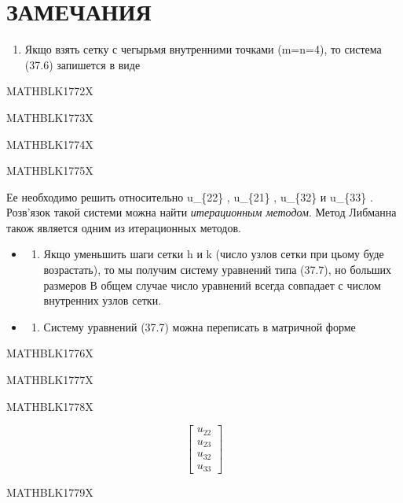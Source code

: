 \documentclass[
  ukrainian,
]{article}
\providecommand{\tightlist}{%
  \setlength{\itemsep}{0pt}\setlength{\parskip}{0pt}}
\begin{document}
\section{ЗАМЕЧАНИЯ}\label{ux437ux430ux43cux435ux447ux430ux43dux438ux44f-12}

\begin{enumerate}
\def\labelenumi{\arabic{enumi}.}
\tightlist
\item
  Якщо взять сетку с чегырьмя внутренними точками (m=n=4), то система
  (37.6) запишется в виде
\end{enumerate}

MATHBLK1772X

MATHBLK1773X

MATHBLK1774X

MATHBLK1775X

Ее необходимо решить относительно u\_\{22\} , u\_\{21\} , u\_\{32\} и
u\_\{33\} . Розв'язок такой системи можна найти \emph{итерационным
методом}. Метод Либманна також является одним из итерационных методов.

\begin{itemize}
\tightlist
\item
  \begin{enumerate}
  \def\labelenumi{\arabic{enumi}.}
  \setcounter{enumi}{1}
  \tightlist
  \item
    Якщо уменьшить шаги сетки h и k (число узлов сетки при цьому буде
    возрастать), то мы получим систему уравнений типа (37.7), но больших
    размеров В общем случае число уравнений всегда совпадает с числом
    внутренних узлов сетки.
  \end{enumerate}
\item
  \begin{enumerate}
  \def\labelenumi{\arabic{enumi}.}
  \setcounter{enumi}{2}
  \tightlist
  \item
    Систему уравнений (37.7) можна переписать в матричной форме
  \end{enumerate}
\end{itemize}

MATHBLK1776X

MATHBLK1777X

MATHBLK1778X

\[
\begin{bmatrix} u_{22} \\ u_{23} \\ u_{32} \\ u_{33} \end{bmatrix}
\]

MATHBLK1779X
\end{document}
